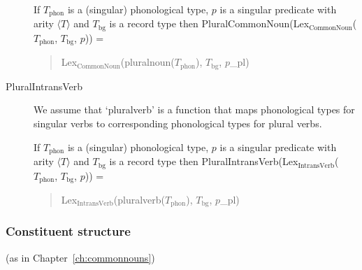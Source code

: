 \begin{description}
  If $T_{\text{phon}}$ is a (singular) phonological type, $p$ is a
  singular predicate with arity $\langle T\rangle$ and $T_{\text{bg}}$
  is a record type then
  PluralCommonNoun(Lex$_{\text{CommonNoun}}$($T_{\text{phon}}$,
  $T_{\text{bg}}$, $p$)) =
  \begin{quote}
    Lex$_{\text{CommonNoun}}$(pluralnoun($T_{\text{phon}}$),
    $T_{\text{bg}}$, $p$\_pl)
  \end{quote}

  
\item[\textnormal{PluralIntransVerb}] \mbox{}

  We assume that `pluralverb' is a function that maps phonological
  types for singular verbs to corresponding phonological types
  for plural verbs.

  If $T_{\text{phon}}$ is a (singular) phonological type, $p$ is a
  singular predicate with arity $\langle T\rangle$ and $T_{\text{bg}}$
  is a record type then
  PluralIntransVerb(Lex$_{\text{IntransVerb}}$($T_{\text{phon}}$,
  $T_{\text{bg}}$, $p$)) =
  \begin{quote}
    Lex$_{\text{IntransVerb}}$(pluralverb($T_{\text{phon}}$),
    $T_{\text{bg}}$, $p$\_pl)
  \end{quote} 
        

  
  
\end{description}


\subsubsection{Constituent structure} (as in Chapter~\ref{ch:commonnouns})



